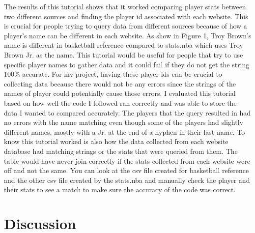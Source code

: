 \documentclass[10pt,twocolumn]{article}
\begin{document}
The results of this tutorial shows that it worked comparing player stats between two different sources and finding the player id associated with each website. This is crucial for people trying to query data from different sources because of how a player's name can be different in each website. As show in Figure 1, Troy Brown's name is different in basketball reference compared to stats.nba which uses Troy Brown Jr. as the name. This tutorial would be useful for people that try to use specific player names to gather data and it could fail if they do not get the string 100\% accurate. For my project, having these player ids can be crucial to collecting data because there would not be any errors since the strings of the names of player could potentially cause those errors. I evaluated this tutorial based on how well the code I followed ran correctly and was able to store the data I wanted to compared accurately. The players that the query resulted in had no errors with the name matching even though some of the players had slightly different names, mostly with a Jr. at the end of a hyphen in their last name. To know this tutorial worked is also how the data collected from each website database had matching strings or the stats that were queried from them. The table would have never join correctly if the stats collected from each website were off and not the same. You can look at the csv file created for basketball reference and the other csv file created by the stats.nba and manually check the player and their stats to see a match to make sure the accuracy of the code was correct. 

\section{Discussion}



\printbibliography 
\end{document}
